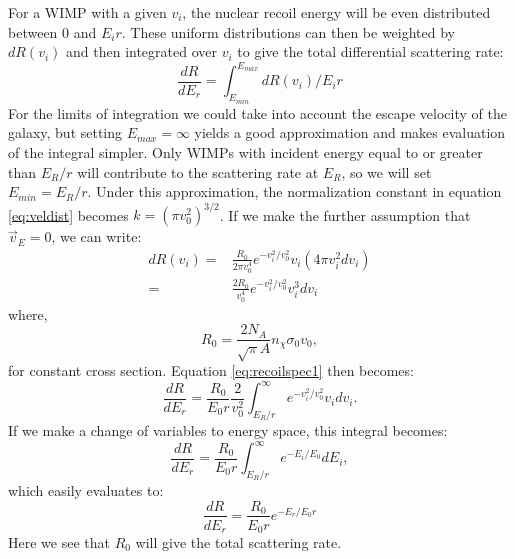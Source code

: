 For a WIMP with a given $v_i$, the nuclear recoil energy will be even distributed between 0 and $E_ir$. These uniform distributions can then be weighted by $dR(v_i)$ and then integrated over $v_i$ to give the total differential scattering rate:
\begin{equation} \label{eq:recoilspec1}
\frac{dR}{dE_{r}}=\int_{E_{min}}^{E_{max}}dR(v_i)/E_ir
\end{equation}
For the limits of integration we could take into account the escape velocity of the galaxy, but setting $E_{max}=\infty$ yields a good approximation and makes evaluation of the integral simpler. Only WIMPs with incident energy equal to or greater than $E_R/r$ will contribute to the scattering rate at $E_R$, so we will set $E_{min}=E_R/r$. Under this approximation, the normalization constant in equation \ref{eq:veldist} becomes $k=(\pi v_0^2)^{3/2}$. If we make the further assumption that $\vec{v}_E=0$, we can write:
\begin{equation}
\begin{split}
dR(v_i)=&\frac{R_0}{2\pi v_0^4} e^{-v_i^2/v_0^2}v_i (4\pi v_i^2dv_i)\\
=&\frac{2R_0}{v_0^4} e^{-v_i^2/v_0^2}v_i^3dv_i
\end{split}
\end{equation}
where, 
\begin{equation}
R_0=\frac{2N_A}{\sqrt{\pi}A}n_{\chi}\sigma_0 v_0,
\end{equation}
for constant cross section. Equation \ref{eq:recoilspec1} then becomes:
\begin{equation} \label{eq:recoilspec2}
\frac{dR}{dE_{r}}= \frac{R_0}{E_0 r}\frac{2}{v_0^2} \int_{E_R/r}^{\infty}   e^{-v_i^2/v_0^2}v_idv_i.
\end{equation}
If we make a change of variables to energy space, this integral becomes:
\begin{equation} \label{eq:recoilspec3}
\frac{dR}{dE_{r}}= \frac{R_0}{E_0 r} \int_{E_R/r}^{\infty}   e^{-E_i/E_0}dE_i,
\end{equation}
which easily evaluates to:
\begin{equation} \label{eq:recoilspec4}
\frac{dR}{dE_{r}}=\frac{R_{0}}{E_{0}r}e^{-E_{r}/E_{0}r}
\end{equation}
Here we see that $R_0$ will give the total scattering rate.

